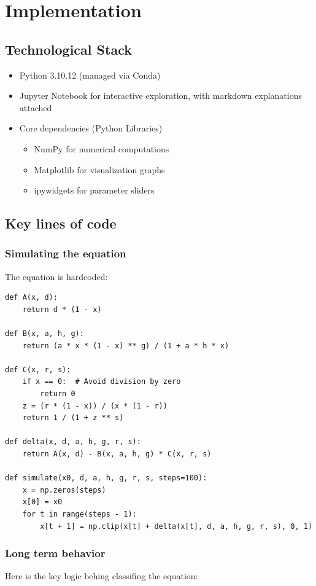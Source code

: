 \documentclass[a4paper, 10pt]{article}
\begin{document}
\clearpage
\section{Implementation}
\subsection{Technological Stack}
\begin{itemize}
	\item Python 3.10.12 (managed via Conda)
	\item Jupyter Notebook for interactive exploration, with markdown explanations attached
	\item Core dependencies (Python Libraries)
	      \begin{itemize}
		      \item NumPy for numerical computations
		      \item Matplotlib for visualization graphs
		      \item ipywidgets for parameter sliders
	      \end{itemize}
\end{itemize}

\subsection{Key lines of code}
\subsubsection{Simulating the equation}
The equation is hardcoded:
\begin{verbatim}
def A(x, d):
    return d * (1 - x)

def B(x, a, h, g):
    return (a * x * (1 - x) ** g) / (1 + a * h * x)

def C(x, r, s):
    if x == 0:  # Avoid division by zero
        return 0
    z = (r * (1 - x)) / (x * (1 - r))
    return 1 / (1 + z ** s)

def delta(x, d, a, h, g, r, s):
    return A(x, d) - B(x, a, h, g) * C(x, r, s)

def simulate(x0, d, a, h, g, r, s, steps=100):
    x = np.zeros(steps)
    x[0] = x0
    for t in range(steps - 1):
        x[t + 1] = np.clip(x[t] + delta(x[t], d, a, h, g, r, s), 0, 1)
\end{verbatim}
\vspace{-3em}
\subsubsection{Long term behavior}
Here is the key logic behing classifing the equation:
\end{document}
